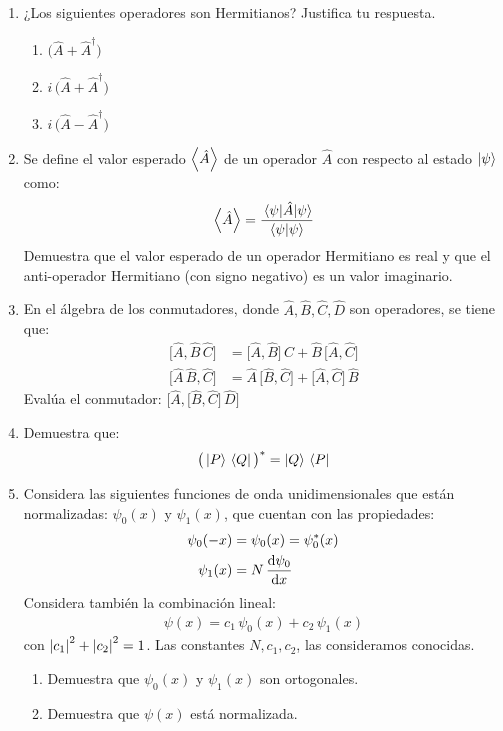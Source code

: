 \begin{enumerate}
\item ¿Los siguientes operadores son Hermitianos? Justifica tu respuesta.
\begin{enumerate}
\item $\big( \hat{A} + \hat{A}^{\dagger} \big)$
\item $i \, \big( \hat{A} + \hat{A}^{\dagger} \big)$
\item $i \, \big( \hat{A} - \hat{A}^{\dagger} \big)$
\end{enumerate}
\item Se define el valor esperado $\expval{\hat{A}}$ de un operador $\hat{A}$ con respecto al estado $\ket{\psi}$ como:
\begin{align*}
\expval{\hat{A}} = \dfrac{\ev{\hat{A}}{\psi}}{\braket{\psi}}    
\end{align*}
Demuestra que el valor esperado de un operador Hermitiano es real y que el anti-operador Hermitiano (con signo negativo) es un valor imaginario.
\item En el álgebra de los conmutadores, donde $\hat{A}, \hat{B}, \hat{C}, \hat{D}$ son operadores, se tiene que:
\begin{align*}
\big[ \hat{A}, \hat{B} \, \hat{C} \big] &= \big[ \hat{A}, \hat{B} \big] \, \hat{C} + \hat{B} \, \big[ \hat{A}, \hat{C} \big] \\[0.5em]
\big[ \hat{A} \, \hat{B} , \hat{C} \big] &= \hat{A} \, \big[\hat{B}, \hat{C} \big] + \big[ \hat{A}, \hat{C} \big] \, \hat{B}
\end{align*}
Evalúa el conmutador: $\big[ \hat{A}, \big[ \hat{B}, \hat{C} ] \, \hat{D}]$
\item Demuestra que:
\begin{align*}
\big( \ket{P} \, \bra{Q} \big)^{*} = \ket{Q} \, \bra{P}
\end{align*}
\item Considera las siguientes funciones de onda unidimensionales que están normalizadas: $\psi_{0}(x)$ y $\psi_{1}(x)$, que cuentan con las propiedades:
\begin{align*}
\psi_{0}(-x) &= \psi_{0}(x) = \psi_{0}^{*} (x) \\
\psi_{1}(x) &= N \, \dv{\psi_{0}}{x}
\end{align*}
Considera también la combinación lineal:
\begin{align*}
\psi(x) = c_{1} \, \psi_{0}(x) + c_{2} \, \psi_{1} (x)
\end{align*}
con $\abs{c_{1}}^{2} + \abs{c_{2}}^{2} = 1$. Las constantes $N, c_{1}, c_{2}$, las consideramos conocidas.
\begin{enumerate}
\item Demuestra que $\psi_{0}(x)$ y $\psi_{1}(x)$ son ortogonales.
\item Demuestra que $\psi(x)$ está normalizada.
\end{enumerate}
\end{enumerate}




